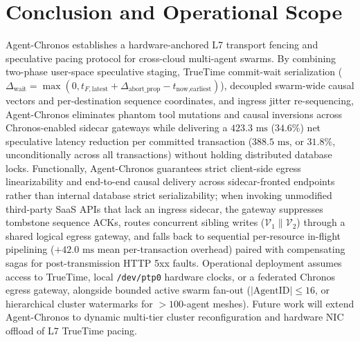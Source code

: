 \documentclass[conference,10pt]{IEEEtran}
\begin{document}
\section{Conclusion and Operational Scope}
\label{sec:conclusion}
Agent-Chronos establishes a hardware-anchored L7 transport fencing and speculative pacing protocol for cross-cloud multi-agent swarms. By combining two-phase user-space speculative staging, TrueTime commit-wait serialization ($\Delta_{\text{wait}} = \max(0, t_{F,\text{latest}} + \Delta_{\text{abort\_prop}} - t_{\text{now},\text{earliest}})$), decoupled swarm-wide causal vectors and per-destination sequence coordinates, and ingress jitter re-sequencing, Agent-Chronos eliminates phantom tool mutations and causal inversions across Chronos-enabled sidecar gateways while delivering a $423.3\text{ ms}$ ($34.6\%$) net speculative latency reduction per committed transaction ($388.5\text{ ms}$, or $31.8\%$, unconditionally across all transactions) without holding distributed database locks. Functionally, Agent-Chronos guarantees strict client-side egress linearizability and end-to-end causal delivery across sidecar-fronted endpoints rather than internal database strict serializability; when invoking unmodified third-party SaaS APIs that lack an ingress sidecar, the gateway suppresses tombstone sequence ACKs, routes concurrent sibling writes ($\mathcal{V}_1 \parallel \mathcal{V}_2$) through a shared logical egress gateway, and falls back to sequential per-resource in-flight pipelining ($+42.0\text{ ms}$ mean per-transaction overhead) paired with compensating sagas for post-transmission HTTP 5xx faults. Operational deployment assumes access to TrueTime, local \texttt{/dev/ptp0} hardware clocks, or a federated Chronos egress gateway, alongside bounded active swarm fan-out ($|\text{AgentID}| \le 16$, or hierarchical cluster watermarks for $>100$-agent meshes). Future work will extend Agent-Chronos to dynamic multi-tier cluster reconfiguration and hardware NIC offload of L7 TrueTime pacing.
\end{document}
